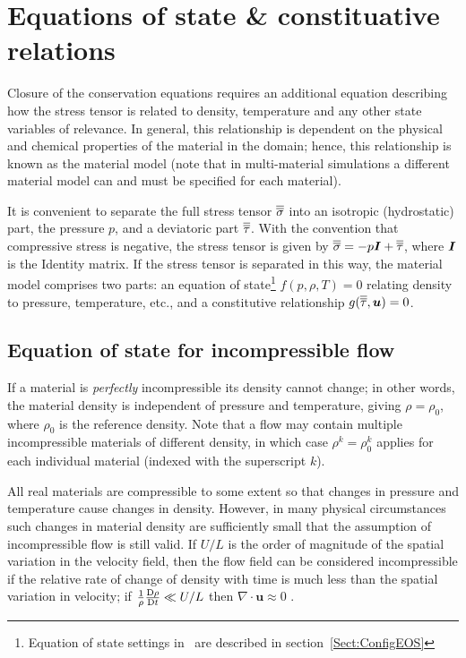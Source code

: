 \section{Equations of state \& constituative relations}
\label{sect:equation_of_state}

Closure of the conservation equations requires an additional equation describing how the stress tensor is related to density, temperature and any other state variables of relevance. In general, this relationship is dependent on the physical and chemical properties of the material in the domain; hence, this relationship is known as the material model (note that in multi-material simulations a different material model can and must be specified for each material).

It is convenient to separate the full stress tensor $\overline{\overline{\sigma}}$ into an isotropic (hydrostatic) part, the pressure $p$, and a deviatoric part $\overline{\overline{\tau}}$.  With the convention that compressive stress is negative, the stress tensor is given by $\overline{\overline{\sigma}} =-p {\mbox{\boldmath$I$}} + \overline{\overline{\tau}}$, where ${\mbox{\boldmath$I$}}$ is the Identity matrix. If the stress tensor is separated in this way, the material model comprises two parts: an equation of state\footnote{Equation of state settings in \fluidity\ are described in section~\ref{Sect:ConfigEOS}} $f(p,\rho,T)=0$ relating density to pressure, temperature, etc., and a constitutive relationship $g(\overline{\overline{\tau}},{\mbox{\boldmath$u$}})=0$.

\subsection{Equation of state for incompressible flow}
\label{Sect:IncompressibleFlow}
If a material is \emph{perfectly} incompressible its density cannot change;
in other words, the material density is independent of pressure and
temperature, giving $\rho = \rho_0$, where $\rho_0$ is the reference
density. Note that a flow may contain multiple incompressible materials of
different density, in which case $\rho^k=\rho_0^k$ applies for each
individual material (indexed with the superscript $k$).

All real materials are compressible to some extent so that changes in
pressure and temperature cause changes in density.  However, in many
physical circumstances such changes in material density are sufficiently
small that the assumption of incompressible flow is still valid. If $U/L$ is
the order of magnitude of the spatial variation in the velocity field, then
the flow field can be considered incompressible if the relative rate of
change of density with time is much less than the spatial variation in
velocity; \ie if $\frac{1}{\rho}\frac{\mathrm{D}\rho}{\mathrm{D} t}\ll U/L$ then
$\nabla\cdot\mathbf{u}\approx 0$ \cite[][p.167]{batchelor1967}.

